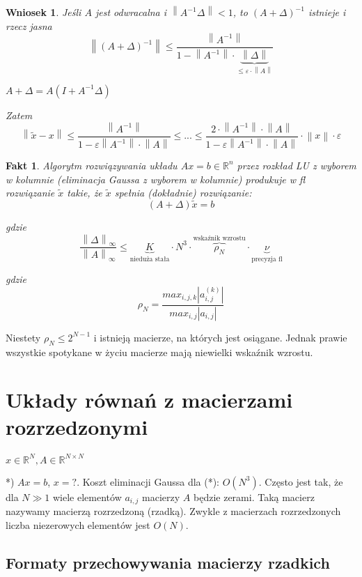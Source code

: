 \documentclass[hidelinks,a4paper,fleqn,oneside]{book}
\newcommand{\RR}{\mathbb{R}}
\newcommand{\norm}[1]{\left\lVert#1\right\rVert}
\newtheorem{wniosek}{Wniosek}
\newtheorem{fakt}{Fakt}
\begin{document}
\begin{wniosek} Jeśli $A$ jest odwracalna i $\norm{A ^ {-1} \Delta} < 1$, to $(A + \Delta)^{-1}$ istnieje i rzecz jasna
	\[
		\norm{(A + \Delta)^{-1}} \leq \frac{\norm{A^{-1}}}{1 - \norm{A^{-1}} \cdot \underbrace{\norm{\Delta}}_{\leq \varepsilon \cdot \norm{A}}}
	\]
	
	$A + \Delta = A(I + A^{-1} \Delta)$
	
	Zatem
	\[
		\norm{\tilde{x} - x} \leq \frac{\norm{A^{-1}}}{1 - \varepsilon \norm{A^{-1}} \cdot \norm{A}} \leq ... \leq \frac{2 \cdot \norm{A^{-1}} \cdot \norm{A}}{1 - \varepsilon \norm{A^{-1}} \cdot \norm{A}} \cdot \norm{x} \cdot \varepsilon
	\]
\end{wniosek}

\begin{fakt} Algorytm rozwiązywania układu $Ax = b \in \RR^n$ przez rozkład LU z wyborem w kolumnie (eliminacja Gaussa z wyborem w kolumnie) produkuje w fl rozwiązanie $\tilde{x}$ takie, że $\tilde{x}$ spełnia (dokładnie) rozwiązanie:
	\[
		(A + \Delta)\tilde{x} = b
	\]
	
	gdzie
	\[
		\frac{\norm{\Delta}_\infty}{\norm{A}_\infty} \leq \underbrace{K}_{\textrm{nieduża stała}} \cdot N^3 \cdot \overbrace{\rho_N}^{\textrm{wskaźnik wzrostu}} \cdot \underbrace{\nu}_{\textrm{precyzja fl}}
	\]
	
	gdzie
	\[
		\rho_N = \frac{max_{i, j, k} |a_{i, j}^{(k)}|}{max_{i, j}|a_{i,j}|}
	\]
\end{fakt}

Niestety $\rho_N \leq 2^{N-1}$ i istnieją macierze, na których jest osiągane. Jednak prawie wszystkie spotykane w życiu macierze mają niewielki wskaźnik wzrostu.

\section{Układy równań z macierzami rozrzedzonymi}

$x \in \RR^N, A \in \RR^{N \times N}$

*) $Ax = b$, $x = ?$. Koszt eliminacji Gaussa dla (*): $O(N^3)$. Często jest tak, że dla $N \gg 1$ wiele elementów $a_{i,j}$ macierzy $A$ będzie zerami. Taką macierz nazywamy macierzą rozrzedzoną (rzadką). Zwykle z macierzach rozrzedzonych liczba niezerowych elementów jest $O(N)$.

\subsection{Formaty przechowywania macierzy rzadkich}
\end{document}
